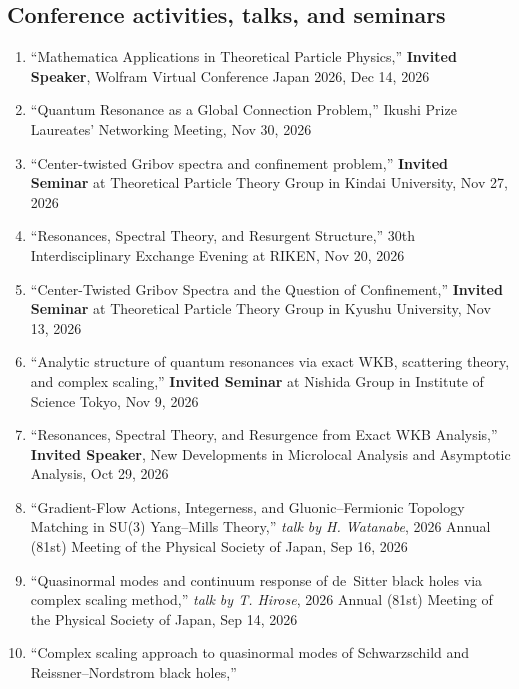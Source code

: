 \renewcommand{\labelenumi}{[\arabic{enumi}]}
\subsection{Conference activities, talks, and seminars}
\begin{enumerate}
 \item ``Mathematica Applications in Theoretical Particle Physics,''
       \textbf{Invited Speaker},
       Wolfram Virtual Conference Japan 2026, Dec 14, 2026
 \item ``Quantum Resonance as a Global Connection Problem,''
       Ikushi Prize Laureates’ Networking Meeting, Nov 30, 2026
 \item ``Center-twisted Gribov spectra and confinement problem,''
       \textbf{Invited Seminar} at Theoretical Particle Theory Group in Kindai University, Nov 27, 2026
 \item ``Resonances, Spectral Theory, and Resurgent Structure,''
       30th Interdisciplinary Exchange Evening at RIKEN, Nov 20, 2026
 \item ``Center-Twisted Gribov Spectra and the Question of Confinement,''
       \textbf{Invited Seminar} at Theoretical Particle Theory Group in Kyushu University, Nov 13, 2026
 \item ``Analytic structure of quantum resonances via exact WKB, scattering theory, and complex scaling,''
       \textbf{Invited Seminar} at Nishida Group in Institute of Science Tokyo, Nov 9, 2026
 \item ``Resonances, Spectral Theory, and Resurgence from Exact WKB Analysis,''
       \textbf{Invited Speaker},
       New Developments in Microlocal Analysis and Asymptotic Analysis, Oct 29, 2026
 \item ``Gradient-Flow Actions, Integerness, and Gluonic--Fermionic Topology Matching in SU(3) Yang--Mills Theory,''
       \textit{talk by H. Watanabe},
       2026 Annual (81st) Meeting of the Physical Society of Japan, Sep 16, 2026
 \item ``Quasinormal modes and continuum response of de~Sitter black holes via complex scaling method,''
       \textit{talk by T. Hirose},
       2026 Annual (81st) Meeting of the Physical Society of Japan, Sep 14, 2026
 \item ``Complex scaling approach to quasinormal modes of Schwarzschild and Reissner--Nordstrom black holes,''

\end{enumerate}

